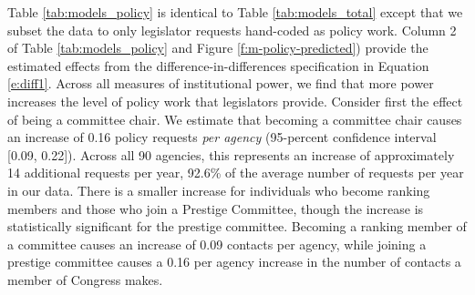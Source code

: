 \documentclass[12pt]{article}
\begin{document}



Table \ref{tab:models_policy} is identical to Table \ref{tab:models_total} except that we subset the data to only legislator requests hand-coded as policy work. 
Column 2 of Table \ref{tab:models_policy} and Figure \ref{f:m-policy-predicted}) provide the estimated effects from the difference-in-differences specification in Equation \ref{e:diff1}. Across all measures of institutional power, we find that more power increases the level of policy work that legislators provide. Consider first the effect of being a committee chair. We estimate that becoming a committee chair causes an increase of 0.16 policy requests \textit{per agency} (95-percent confidence interval [0.09, 0.22]). Across all 90 agencies, this represents an increase of approximately 14 additional requests per year, 92.6\% of the average number of requests per year in our data. There is a smaller increase for individuals who become ranking members and those who join a Prestige Committee, though the increase is statistically significant for the prestige committee. Becoming a ranking member of a committee causes an increase of 0.09 contacts per agency, while joining a prestige committee causes a 0.16 per agency increase in the number of contacts a member of Congress makes.
\end{document}
